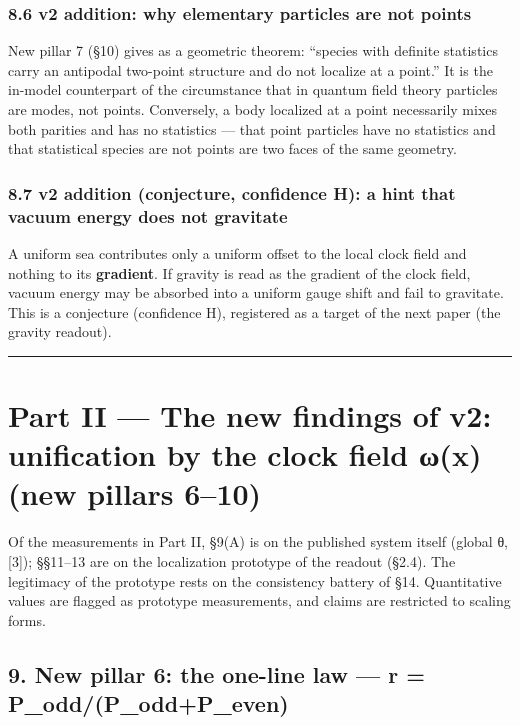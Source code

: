 \documentclass[
]{article}
\begin{document}
\subsubsection{8.6 v2 addition: why elementary particles are not
points}\label{v2-addition-why-elementary-particles-are-not-points}

New pillar 7 (§10) gives as a geometric theorem: ``species with definite
statistics carry an antipodal two-point structure and do not localize at
a point.'' It is the in-model counterpart of the circumstance that in
quantum field theory particles are modes, not points. Conversely, a body
localized at a point necessarily mixes both parities and has no
statistics --- that point particles have no statistics and that
statistical species are not points are two faces of the same geometry.

\subsubsection{8.7 v2 addition (conjecture, confidence H): a hint that
vacuum energy does not
gravitate}\label{v2-addition-conjecture-confidence-h-a-hint-that-vacuum-energy-does-not-gravitate}

A uniform sea contributes only a uniform offset to the local clock field
and nothing to its \textbf{gradient}. If gravity is read as the gradient
of the clock field, vacuum energy may be absorbed into a uniform gauge
shift and fail to gravitate. This is a conjecture (confidence H),
registered as a target of the next paper (the gravity readout).

\begin{center}\rule{0.5\linewidth}{0.5pt}\end{center}

\section{Part II --- The new findings of v2: unification by the clock
field ω(x) (new pillars
6--10)}\label{part-ii-the-new-findings-of-v2-unification-by-the-clock-field-ux3c9x-new-pillars-610}

Of the measurements in Part II, §9(A) is on the published system itself
(global θ, {[}3{]}); §§11--13 are on the localization prototype of the
readout (§2.4). The legitimacy of the prototype rests on the consistency
battery of §14. Quantitative values are flagged as prototype
measurements, and claims are restricted to scaling forms.

\subsection{9. New pillar 6: the one-line law --- r =
P\_odd/(P\_odd+P\_even)}\label{new-pillar-6-the-one-line-law-r-p_oddp_oddp_even}
\end{document}
